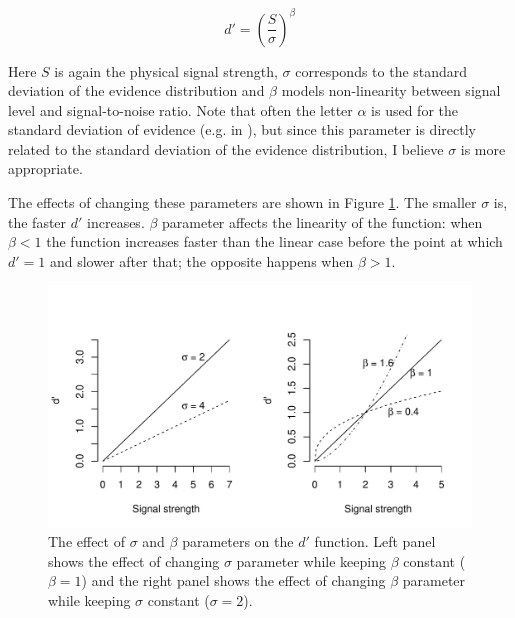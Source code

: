 \documentclass{article}\usepackage{knitr}
\begin{document}
\begin{equation}
d' = (\frac{S}{\sigma})^\beta
\label{eq:dprimefunc}
\end{equation}

Here $S$ is again the physical signal strength, $\sigma$ corresponds to the standard deviation of the evidence distribution and $\beta$ models non-linearity between signal level and signal-to-noise ratio. Note that often the letter $\alpha$ is used for the standard deviation of evidence (e.g. in \cite{dai2011, kontsevichtyler1999, kingdomprins2010}), but since this parameter is directly related to the standard deviation of the evidence distribution, I believe $\sigma$ is more appropriate. 

The effects of changing these parameters are shown in Figure \ref{fig:dprimefunc}. The smaller $\sigma$ is, the faster $d'$ increases. $\beta$ parameter affects the linearity of the function: when $\beta < 1$ the function increases faster than the linear case before the point at which $d' = 1$ and slower after that; the opposite happens when $\beta > 1$. 

\begin{figure}[!htb]
\begin{center}
\begin{knitrout}
\color{fgcolor}
\includegraphics[width=\maxwidth]{figure/unnamed-chunk-4-1} 
\end{knitrout}
\end{center}
\caption{ The effect of $\sigma$ and $\beta$ parameters on the $d'$ function. Left panel shows the effect of changing $\sigma$ parameter while keeping $\beta$ constant ($\beta = 1$) and the right panel shows the effect of changing $\beta$ parameter while keeping $\sigma$ constant ($\sigma = 2$).}
\label{fig:dprimefunc}
\end{figure}
\end{document}
